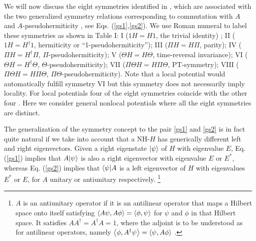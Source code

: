We will now discuss the eight symmetries identified in \cite{Ruschhaupt2017},
which are associated with the two generalized symmetry relations corresponding to commutation with $A$ and $A$-pseudohermiticity \cite{Mostafazadeh2002}, see Eqs. (\ref{gs1},\ref{gs2}).
%
%
We use Roman numeral to label these symmetries as shown in Table I: I ($1H=H1$, the trivial identity)
; II ($1H=H^\dagger 1$, hermiticity or ``1-pseudohermiticity''); III ($\Pi H=H\Pi$, parity); IV ($\Pi H=H^\dagger \Pi$, $\Pi$-pseudohermiticity);  V ($\Theta H=H\Theta$, time-reversal invariance);  VI ($\Theta H=H^\dagger \Theta$, $\Theta$-pseudohermiticity);
VII ($\Pi\Theta H=H\Pi\Theta$, PT-symmetry); VIII ($\Pi\Theta H=H\Pi\Theta$, $\Pi\Theta$-pseudohermiticity).
Note that a local potential would automatically fulfill symmetry VI but this symmetry does not necessarily imply locality.
For local potentials four of the eight symmetries coincide with the other four \cite{Ruschhaupt2017}. Here we consider general nonlocal potentials where all the eight symmetries are distinct.


The generalization of the symmetry concept to the pair \eqref{gs1} and \eqref{gs2} is in fact quite natural if we take into account that a NH-$H$
has generically different left and right eigenvectors. Given a right eigenstate $\ket{\psi}$ of $H$ with eigenvalue $E$, Eq. (\ref{gs1}) implies that  $A|\psi\rangle$ is also a right eigenvector with eigenvalue $E$ or $E^*$, whereas Eq. (\ref{gs2}) implies that $\langle \psi|A$ is a left eigenvector of $H$ with eigenvalues $E^*$ or $E$,  for $A$ unitary or antiunitary respectively. \footnote{$A$ is an antiunitary operator if it is an antilinear operator that maps a Hilbert space onto itself satisfying $\expval{A \psi,A\phi}= \expval{\phi,\psi}$ for $\psi$ and $\phi$ in that Hilbert space. It  satisfies $AA^{\dagger}=A^\dagger A=1$, where the adjoint is to be understood as for antilinear operators, namely  $\expval{\phi,A^\dagger\psi} = \expval{\psi,A \phi}$ \cite{Muga2004}.}

